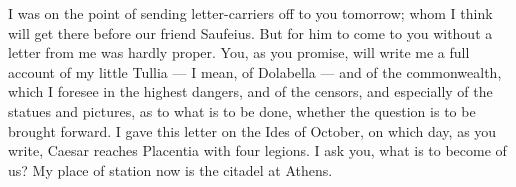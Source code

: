  I was on the point of sending letter-carriers off to you tomorrow; whom I think will get there before our friend Saufeius. But for him to come to you without a letter from me was hardly proper. You, as you promise, will write me a full account of my little Tullia --- I mean, of Dolabella --- and of the commonwealth, which I foresee in the highest dangers, and of the censors, and especially of the statues and pictures, as to what is to be done, whether the question is to be brought forward. I gave this letter on the Ides of October, on which day, as you write, Caesar reaches Placentia with four legions. I ask you, what is to become of us? My place of station now is the citadel at Athens.
